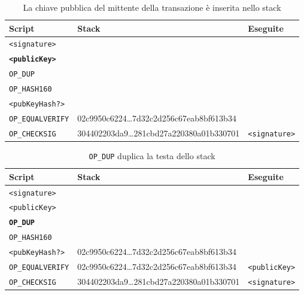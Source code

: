\begin{table}[H]
    \centering
    \begin{tabular}{p{3cm}|p{7.7cm}|p{3cm}}
        Script & Stack & Eseguite\\
        \hline
        \texttt{<signature>}          & &\\
        \texttt{\textbf{<publicKey>}} & &\\
        \texttt{OP\_DUP}              & &\\
        \texttt{OP\_HASH160}          & &\\
        \texttt{<pubKeyHash?>}        & &\\
        \texttt{OP\_EQUALVERIFY}      & 02c9950c6224\dots7d32c2d256c67eab8bf613b34 &\\
        \texttt{OP\_CHECKSIG}         & 304402203da9\dots281cbd27a220380a01b330701 & \texttt{<signature>}\\
    \end{tabular}
    \caption{La chiave pubblica del mittente della transazione è inserita nello stack}
\end{table}

\begin{table}[H]
    \centering
    \begin{tabular}{p{3cm}|p{7.7cm}|p{3cm}}
        Script & Stack & Eseguite\\
        \hline
        \texttt{<signature>}          & &\\
        \texttt{<publicKey>}          & &\\
        \texttt{\textbf{OP\_DUP}}     & &\\
        \texttt{OP\_HASH160}          & &\\
        \texttt{<pubKeyHash?>}        & 02c9950c6224\dots7d32c2d256c67eab8bf613b34 &\\
        \texttt{OP\_EQUALVERIFY}      & 02c9950c6224\dots7d32c2d256c67eab8bf613b34 & \texttt{<publicKey>}\\
        \texttt{OP\_CHECKSIG}         & 304402203da9\dots281cbd27a220380a01b330701 & \texttt{<signature>}\\
    \end{tabular}
    \caption{\texttt{OP\_DUP} duplica la testa dello stack}
\end{table}

